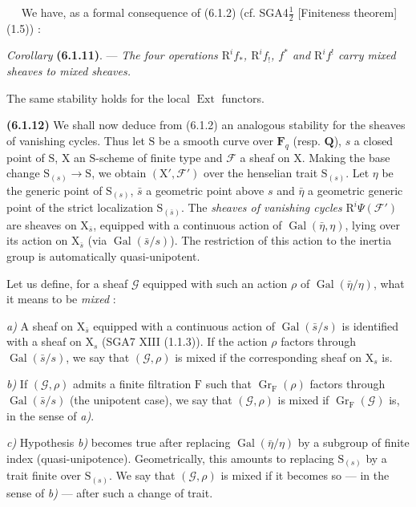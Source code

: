 \documentclass[11pt,leqno]{article}
\newcommand{\Page}[1]{\ifvmode\noindent\else\unskip\ \fi{\footnotesize\textcolor{gray}{[p.\,#1]}}\ \ignorespaces}
\begin{document}
\Page{246}
We have, as a formal consequence of (6.1.2)
(cf. SGA4\(\frac{1}{2}\) [Finiteness theorem] (1.5)) :

\textit{Corollary} \textbf{(6.1.11)}. — \textit{The four operations
\(\mathrm{R}^if_*\), \(\mathrm{R}^if_!\), \(f^*\) and
\(\mathrm{R}^if^!\) carry mixed sheaves to mixed sheaves.}

The same stability holds for the local \(\operatorname{Ext}\) functors.

\textbf{(6.1.12)} We shall now deduce from (6.1.2) an
analogous stability for the sheaves of vanishing cycles.
Thus let \(\mathrm{S}\) be a smooth curve over \(\mathbf{F}_q\)
(resp. \(\mathbf{Q}\)), \(s\) a closed point of \(\mathrm{S}\),
\(\mathrm{X}\) an \(\mathrm{S}\)-scheme of finite type and \(\mathscr{F}\)
a sheaf on \(\mathrm{X}\). Making the base change
\(\mathrm{S}_{(s)}\to\mathrm{S}\), we obtain
\((\mathrm{X}',\mathscr{F}')\) over the henselian trait
\(\mathrm{S}_{(s)}\). Let \(\eta\) be the generic point of
\(\mathrm{S}_{(s)}\), \(\bar{s}\) a geometric point above
\(s\) and \(\bar{\eta}\) a geometric generic point of the strict
localization \(\mathrm{S}_{(\bar{s})}\). The \textit{sheaves of vanishing
cycles} \(\mathrm{R}^i\Psi(\mathscr{F}')\) are sheaves
on \(\mathrm{X}_{\bar{s}}\), equipped with a continuous action of
\(\operatorname{Gal}(\bar{\eta},\eta)\), lying over its action on
\(\mathrm{X}_{\bar{s}}\) (via \(\operatorname{Gal}(\bar{s}/s)\)).
The restriction of this action to the inertia group is
automatically quasi-unipotent.

Let us define, for a sheaf \(\mathscr{G}\) equipped with such an
action \(\rho\) of \(\operatorname{Gal}(\bar{\eta}/\eta)\), what it
means to be \textit{mixed} :

\textit{a)} A sheaf on \(\mathrm{X}_{\bar{s}}\) equipped with a continuous
action of \(\operatorname{Gal}(\bar{s}/s)\) is identified with a
sheaf on \(\mathrm{X}_s\) (SGA7 XIII (1.1.3)). If the action
\(\rho\) factors through \(\operatorname{Gal}(\bar{s}/s)\), we say
that \((\mathscr{G},\rho)\) is mixed if the corresponding sheaf
on \(\mathrm{X}_s\) is.

\textit{b)} If \((\mathscr{G},\rho)\) admits a finite filtration
\(\mathrm{F}\) such that \(\operatorname{Gr}_{\mathrm{F}}(\rho)\)
factors through \(\operatorname{Gal}(\bar{s}/s)\) (the unipotent case),
we say that \((\mathscr{G},\rho)\) is mixed if
\(\operatorname{Gr}_{\mathrm{F}}(\mathscr{G})\) is, in the sense of
\textit{a)}.

\textit{c)} Hypothesis \textit{b)} becomes true after replacing
\(\operatorname{Gal}(\bar{\eta}/\eta)\) by a subgroup of finite
index (quasi-unipotence). Geometrically, this amounts to replacing
\(\mathrm{S}_{(s)}\) by a trait finite over \(\mathrm{S}_{(s)}\).
We say that \((\mathscr{G},\rho)\) is mixed if it becomes so — in
the sense of \textit{b)} — after such a change of trait.
\end{document}
